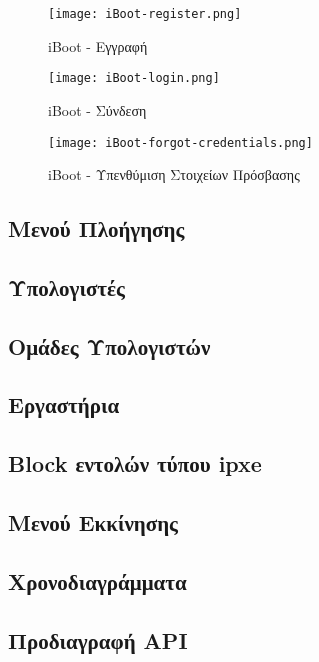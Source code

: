 \FloatBarrier

\begin{figure}[ht]
	\centering
	\texttt{[image: iBoot-register.png]}
	\caption{iBoot - Εγγραφή}
	\label{fig:iBoot_register}
\end{figure}

\begin{figure}[ht]
	\centering
	\texttt{[image: iBoot-login.png]}
	\caption{iBoot - Σύνδεση}
	\label{fig:iBoot_login}
\end{figure}

\begin{figure}[ht]
	\centering
	\texttt{[image: iBoot-forgot-credentials.png]}
	\caption{iBoot - Υπενθύμιση Στοιχείων Πρόσβασης}
	\label{fig:iBoot_forgot_credentials}
\end{figure}

\FloatBarrier

\subsection{Μενού Πλοήγησης}

\subsection{Υπολογιστές}

\subsection{Ομάδες Υπολογιστών}

\subsection{Εργαστήρια}

\subsection{Block εντολών τύπου ipxe}

\subsection{Μενού Εκκίνησης}

\subsection{Χρονοδιαγράμματα}

\subsection{Προδιαγραφή API}

